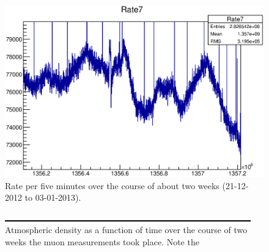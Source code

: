  \begin{figure}
	\includegraphics[width = 0.9 \textwidth]{graphics/setup/stability.eps}
  	\caption[Muon module stability]{Rate per five minutes over the course of about two weeks (21-12-2012 to 03-01-2013). }
  \end{figure}

  \begin{figure}
	\centering
  	\includegraphics[width = 0.9 \textwidth]{graphics/dummy.eps}
  	\caption[Atmospheric density stability measurement]{Atmospheric density as a function of time over the course of two weeks the muon measurements took place. Note the }
  	\label{fig:moduleStability}
  \end{figure}

